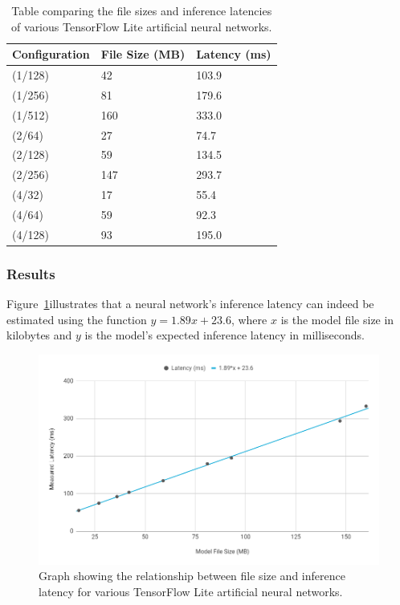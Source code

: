 \begin{table}[]
    \centering
    \captionsetup{justification=centering}
    \begin{tabular}{lll}
        Configuration & File Size (MB) & Latency (ms) \\
        \hline
        (1/128)       & 42             & 103.9        \\
        (1/256)       & 81             & 179.6        \\
        (1/512)       & 160            & 333.0        \\
        (2/64)        & 27             & 74.7         \\
        (2/128)       & 59             & 134.5        \\
        (2/256)       & 147            & 293.7        \\
        (4/32)        & 17             & 55.4         \\
        (4/64)        & 59             & 92.3         \\
        (4/128)       & 93             & 195.0
    \end{tabular}
    \caption{Table comparing the file sizes and inference latencies of various TensorFlow Lite artificial neural networks.}
    \label{tab:ann_configs}
\end{table}

\subsubsection{Results}
Figure~\ref{fig:latency_results}\@ illustrates that a neural network's inference latency can indeed be estimated using the function $y = 1.89x + 23.6$, where $x$ is the model file size in kilobytes and $y$ is the model's expected inference latency in milliseconds.

\begin{figure}[h]
    \centering
    \captionsetup{justification=centering}
    \includegraphics[width=\linewidth]{figures/latency_results}
    \caption{Graph showing the relationship between file size and inference latency for various TensorFlow Lite artificial neural networks.}
    \label{fig:latency_results}
\end{figure}

